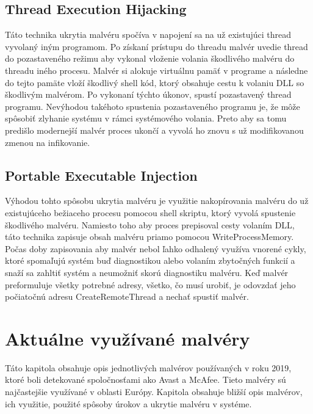 \subsection{Thread Execution Hijacking }
\noindent Táto technika ukrytia malvéru spočíva v napojení sa na už existujúci thread vyvolaný iným programom. Po získaní prístupu do threadu malvér uvedie thread do pozastaveného režimu aby vykonal vloženie volania škodlivého malvéru do threadu iného procesu. Malvér si alokuje virtuálnu pamäť v programe a následne do tejto pamäte vloží škodlivý shell kód, ktorý obsahuje cestu k volaniu DLL so škodlivým malvérom.  Po vykonaní týchto úkonov, spustí pozastavený thread programu. Nevýhodou takéhoto spustenia pozastaveného programu je, že môže spôsobiť zlyhanie systému v rámci systémového volania. Preto aby sa tomu predišlo modernejší malvér proces ukončí a vyvolá ho znovu s už modifikovanou zmenou na infikovanie.

\subsection{Portable Executable Injection}
\noindent Výhodou tohto spôsobu ukrytia malvéru je využitie nakopírovania malvéru do už existujúceho bežiaceho procesu pomocou shell skriptu, ktorý vyvolá spustenie škodlivého malvéru. Namiesto toho aby proces prepisoval cesty volaním  DLL, táto technika zapisuje obsah malvéru priamo pomocou WriteProcessMemory. Počas doby zapisovania aby malvér nebol ľahko odhalený využíva vnorené cykly, ktoré spomaľujú systém buď diagnostikou alebo volaním zbytočných funkcií a snaží sa zahltiť systém a neumožniť skorú diagnostiku malvéru.  Keď malvér preformuluje všetky potrebné adresy, všetko, čo musí urobiť, je odovzdať jeho počiatočnú adresu CreateRemoteThread a nechať spustiť malvér.

\section{Aktuálne využívané malvéry}
\noindent Táto kapitola obsahuje opis jednotlivých malvérov používaných v roku 2019, ktoré boli detekované spoločnosťami ako Avast a McAfee. Tieto malvéry sú najčastejšie využívané v oblasti Európy. Kapitola obsahuje bližší opis malvérov, ich využitie, použité spôsoby úrokov a ukrytie malvéru v systéme.

